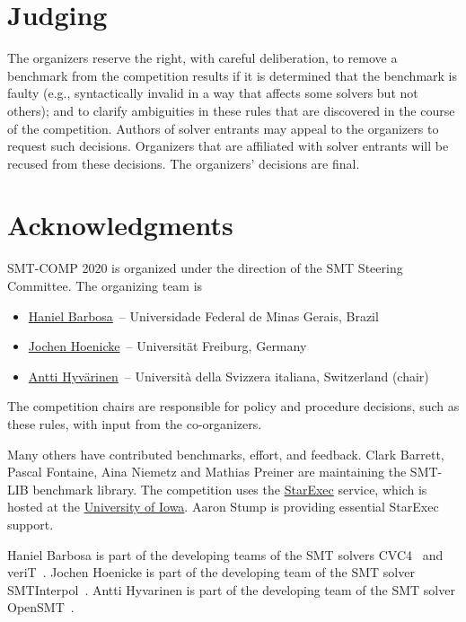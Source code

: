 \documentclass[12pt]{article}
\begin{document}

\section{Judging}

The organizers reserve the right, with careful deliberation, to remove
a benchmark from the competition results if it is determined that the
benchmark is faulty (e.g., syntactically invalid in a way that affects
some solvers but not others); and to clarify ambiguities in these
rules that are discovered in the course of the competition.  Authors
of solver entrants may appeal to the organizers to request such
decisions.  Organizers that are affiliated with solver entrants will
be recused from these decisions.  The organizers' decisions are final.


\section{Acknowledgments}

SMT-COMP 2020 is organized under the direction of the SMT Steering
Committee. The organizing team is
%
\begin{itemize}
\setlength{\itemsep}{0pt}
\item \href{http://homepages.dcc.ufmg.br/~hbarbosa/}{Haniel Barbosa}~-- Universidade Federal de Minas Gerais, Brazil
\item \href{https://jochen-hoenicke.de/}{Jochen Hoenicke}~-- Universit\"at Freiburg, Germany
\item \href{http://www.inf.usi.ch/postdoc/hyvarinen/}{Antti Hyv\"arinen}~--
    Universit\`a della Svizzera italiana, Switzerland (chair)
\end{itemize}
%
The competition chairs are responsible for policy and procedure decisions,
such as these rules, with input from the co-organizers.

Many others have contributed benchmarks, effort, and feedback.  Clark Barrett,
Pascal Fontaine, Aina Niemetz and Mathias Preiner are maintaining the SMT-LIB
benchmark library.
The competition uses the
\href{https://www.starexec.org/}{StarExec} service, which is hosted at
the \href{http://www.cs.uiowa.edu/}{University of Iowa}.  Aaron Stump
is providing essential StarExec support.

%
Haniel Barbosa is part of the developing teams of the SMT solvers
CVC4~\cite{cvc4-smtcomp18} and veriT~\cite{verit}.
%
Jochen Hoenicke is part of the developing team of the SMT solver
SMTInterpol~\cite{smtinterpol}.
Antti Hyvarinen is part of the developing team of the SMT solver
OpenSMT~\cite{opensmt2}.


\pagebreak



\end{document}
